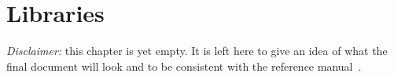 \chapter{Libraries}
\label{chap:lib}

\emph{Disclaimer:} this chapter is yet empty. It is left here to give an idea of
what the final document will look and to be consistent with the \acsl reference
manual~\cite{acsl}.
